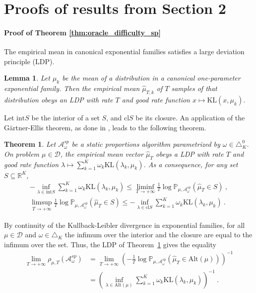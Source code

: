 \documentclass{article}
\newcommand{\KL}{\mathrm{KL}}
\newcommand{\alt}{\mathrm{Alt}}
\newtheorem{theorem}{Theorem}
\newtheorem{lemma}{Lemma}
\begin{document}



\appendix

\section{Proofs of results from Section 2}
\label{sec:proofs_relative_to_section_sec:algorithmic_classes}

\paragraph{Proof of Theorem \ref{thm:oracle_difficulty_sp}}

The empirical mean in canonical exponential families satisfies a large deviation principle (LDP).

\begin{lemma}\label{lem:ldp_single_arm}
Let $\mu_k$ be the mean of a distribution in a canonical one-parameter exponential family. Then the empirical mean $\hat{\mu}_{T,k}$ of $T$ samples of that distribution obeys an LDP with rate $T$ and good rate function $x \mapsto \KL(x, \mu_k)$.
\end{lemma}

Let $\mathrm{int} S$ be the interior of a set $S$, and $\mathrm{cl} S$ be its closure.
An application of the Gärtner-Ellis theorem, as done in \cite{glynn2004large}, leads to the following theorem.
\begin{theorem}\label{thm:ldp}
Let $\mathcal A_\omega^{sp}$ be a static proportions algorithm parametrized by $\omega \in \triangle_K^0$. On problem $\mu \in \mathcal D$, the empirical mean vector $\hat{\mu}_T$ obeys a LDP with rate $T$ and good rate function $\lambda \mapsto \sum_{k=1}^K \omega_k \KL(\lambda_k, \mu_k)$. As a consequence, for any set $S \subseteq \mathbb{R}^K$,
\begin{align*}
- \inf_{\lambda \in \mathrm{int} S} \sum_{k=1}^K \omega_k \KL(\lambda_k, \mu_k)
\le \liminf_{T\to +\infty} \frac{1}{T} \log \mathbb{P}_{\mu, \mathcal A_\omega^{sp}}(\hat{\mu}_T \in S) \: ,
\\
\limsup_{T\to +\infty} \frac{1}{T} \log \mathbb{P}_{\mu, \mathcal A_\omega^{sp}}(\hat{\mu}_T \in S) 
\le - \inf_{\lambda \in \mathrm{cl} S} \sum_{k=1}^K \omega_k \KL(\lambda_k, \mu_k)
\: .
\end{align*}
\end{theorem}

By continuity of the Kullback-Leibler divergence in exponential families, for all $\mu \in \mathcal D$ and $\omega \in \triangle_K$ the infimum over the interior and the closure are equal to the infimum over the set.
Thus, the LDP of Theorem~\ref{thm:ldp} gives the equality 
\begin{align*}
\lim_{T \to +\infty}\rho_{\mu, T}(\mathcal A^{sp}_\omega)
&= \lim_{T \to +\infty}\left(- \frac{1}{T} \log \mathbb{P}_{\mu, \mathcal A_\omega^{sp}}(\hat{\mu}_T \in \alt(\mu)) \right)^{-1}
\\
&= \left(\inf_{\lambda \in \alt(\mu)} \sum_{k=1}^K \omega_k \KL(\lambda_k, \mu_k) \right)^{-1}
\: .
\end{align*}
\end{document}
